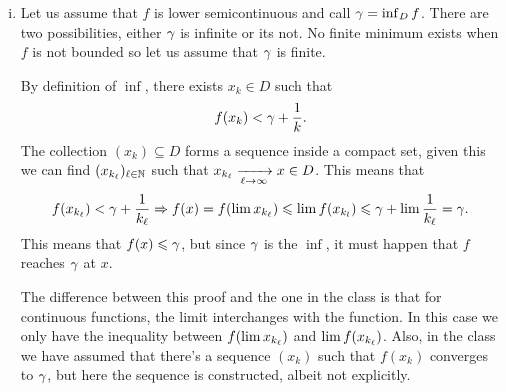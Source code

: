 \documentclass[12pt]{memoir}
\begin{document}
\begin{ptcbr}
\begin{enumerate}[i)]
    \item Let us assume that $f$ is lower semicontinuous and call $\gamma=\inf_D f$. There are two possibilities, either $\gamma$ is infinite or its not. No finite minimum exists when $f$ is not bounded so let us assume that $\gamma$ is finite.\par 
    By definition of $\inf$, there exists $x_k\in D$ such that 
    $$f(x_k)<\gamma+\frac1k.$$
    The collection $(x_k)\subseteq D$ forms a sequence inside a compact set, given this we can find $(x_{k_\ell})_{\ell\in\mathbb{N}}$ such that $x_{k_\ell}\xrightarrow[\ell\to\infty]{}x\in D$. This means that 
    $$f(x_{k_\ell})<\gamma+\frac{1}{k_\ell}\Rightarrow f(x)=f(\lim x_{k_\ell})\leqslant \lim f(x_{k_l})\leqslant \gamma+\lim\frac{1}{k_\ell}=\gamma.$$
    This means that $f(x)\leqslant \gamma$, but since $\gamma$ is the $\inf$, it must happen that $f$ reaches $\gamma$ at $x$.\par 
    The difference between this proof and the one in the class is that for continuous functions, the limit interchanges with the function. In this case we only have the inequality between $f(\lim x_{k_\ell})$ and $\lim f(x_{k_\ell})$. Also, in the class we have assumed that there's a sequence $(x_k)$ such that $f(x_k)$ converges to $\gamma$, but here the sequence is constructed, albeit not explicitly. 
\end{enumerate}
\end{ptcbr}
\end{document}
